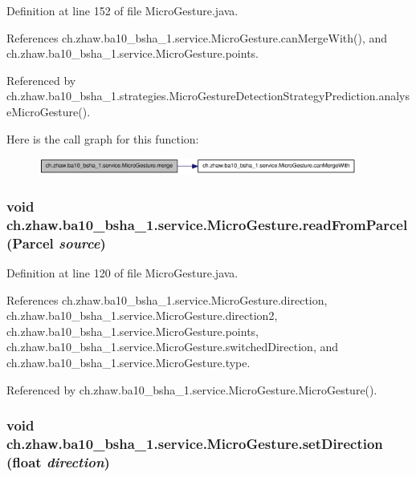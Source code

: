 Definition at line 152 of file MicroGesture.java.

References ch.zhaw.ba10\_\-bsha\_\-1.service.MicroGesture.canMergeWith(), and ch.zhaw.ba10\_\-bsha\_\-1.service.MicroGesture.points.

Referenced by ch.zhaw.ba10\_\-bsha\_\-1.strategies.MicroGestureDetectionStrategyPrediction.analyseMicroGesture().

Here is the call graph for this function:\nopagebreak
\begin{figure}[H]
\begin{center}
\leavevmode
\includegraphics[width=297pt]{classch_1_1zhaw_1_1ba10__bsha__1_1_1service_1_1MicroGesture_a363ee314636824c156497dd7138edaa9_cgraph}
\end{center}
\end{figure}
\hypertarget{classch_1_1zhaw_1_1ba10__bsha__1_1_1service_1_1MicroGesture_ad3f092e31d34245e598866b7e11e8d42}{
\subsubsection[{readFromParcel}]{\setlength{\rightskip}{0pt plus 5cm}void ch.zhaw.ba10\_\-bsha\_\-1.service.MicroGesture.readFromParcel (Parcel {\em source})}}
\label{classch_1_1zhaw_1_1ba10__bsha__1_1_1service_1_1MicroGesture_ad3f092e31d34245e598866b7e11e8d42}


Definition at line 120 of file MicroGesture.java.

References ch.zhaw.ba10\_\-bsha\_\-1.service.MicroGesture.direction, ch.zhaw.ba10\_\-bsha\_\-1.service.MicroGesture.direction2, ch.zhaw.ba10\_\-bsha\_\-1.service.MicroGesture.points, ch.zhaw.ba10\_\-bsha\_\-1.service.MicroGesture.switchedDirection, and ch.zhaw.ba10\_\-bsha\_\-1.service.MicroGesture.type.

Referenced by ch.zhaw.ba10\_\-bsha\_\-1.service.MicroGesture.MicroGesture().\hypertarget{classch_1_1zhaw_1_1ba10__bsha__1_1_1service_1_1MicroGesture_ab3b057406a8b11af28ec1bb73be22e58}{
\subsubsection[{setDirection}]{\setlength{\rightskip}{0pt plus 5cm}void ch.zhaw.ba10\_\-bsha\_\-1.service.MicroGesture.setDirection (float {\em direction})}}
\label{classch_1_1zhaw_1_1ba10__bsha__1_1_1service_1_1MicroGesture_ab3b057406a8b11af28ec1bb73be22e58}


